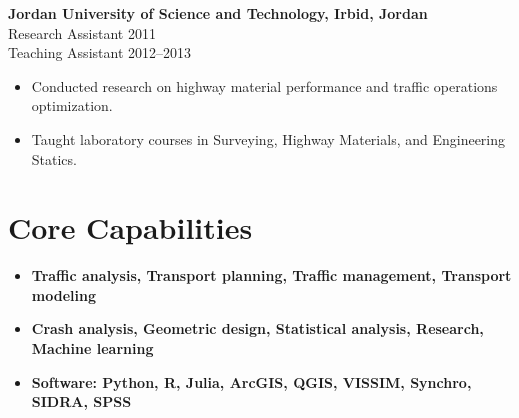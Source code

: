 \documentclass[10pt, letterpaper]{article}
\begin{document}
\textbf{Jordan University of Science and Technology, Irbid, Jordan} \\
Research Assistant \hfill 2011 \\
Teaching Assistant \hfill 2012–2013 \\
\begin{itemize}[left=0pt]
    \item Conducted research on highway material performance and traffic operations optimization.
    \item Taught laboratory courses in Surveying, Highway Materials, and Engineering Statics.
\end{itemize}

\section*{Core Capabilities}
\begin{itemize}[left=0pt]
    \item \textbf{Traffic analysis, Transport planning, Traffic management, Transport modeling}
    \item \textbf{Crash analysis, Geometric design, Statistical analysis, Research, Machine learning}
   \item \textbf{Software: Python, R, Julia, ArcGIS, QGIS, VISSIM, Synchro, SIDRA, SPSS}
\end{itemize}
\end{document}
